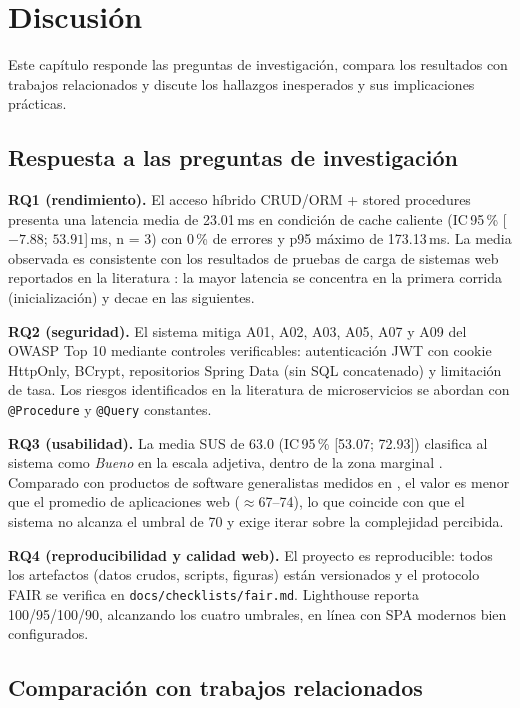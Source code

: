\chapter{Discusión}
\label{cap:discusion}

Este capítulo responde las preguntas de investigación, compara los resultados con
trabajos relacionados y discute los hallazgos inesperados y sus implicaciones
prácticas.

\section{Respuesta a las preguntas de investigación}

\textbf{RQ1 (rendimiento).} El acceso híbrido CRUD/ORM + stored procedures presenta
una latencia media de 23.01\,ms en condición de cache caliente (IC\,95\,\%
[$-7.88$; $53.91$]\,ms, n = 3) con 0\,\% de errores y p95 máximo de 173.13\,ms.
La media observada es consistente con los resultados de pruebas de carga de
sistemas web reportados en la literatura \cite{jiang2015,jiang2009}: la mayor
latencia se concentra en la primera corrida (inicialización) y decae en las
siguientes.

\textbf{RQ2 (seguridad).} El sistema mitiga A01, A02, A03, A05, A07 y A09 del
OWASP Top 10 \cite{owasp2021} mediante controles verificables: autenticación JWT
con cookie HttpOnly, BCrypt, repositorios Spring Data (sin SQL concatenado) y
limitación de tasa. Los riesgos identificados en la literatura de microservicios
\cite{soldani2018,waseem2021,taibi2018} se abordan con \texttt{@Procedure} y
\texttt{@Query} constantes.

\textbf{RQ3 (usabilidad).} La media SUS de 63.0 (IC\,95\,\% [53.07; 72.93])
clasifica al sistema como \emph{Bueno} en la escala adjetiva, dentro de la zona
marginal \cite{bangor2009,bangor2008}. Comparado con productos de software
generalistas medidos en \cite{kortum2013}, el valor es menor que el promedio de
aplicaciones web ($\approx$67--74), lo que coincide con que el sistema no alcanza el
umbral de 70 y exige iterar sobre la complejidad percibida.

\textbf{RQ4 (reproducibilidad y calidad web).} El proyecto es reproducible: todos
los artefactos (datos crudos, scripts, figuras) están versionados y el protocolo
FAIR se verifica en \texttt{docs/checklists/fair.md}. Lighthouse reporta 100/95/100/90,
alcanzando los cuatro umbrales, en línea con SPA modernos bien configurados.

\section{Comparación con trabajos relacionados}


